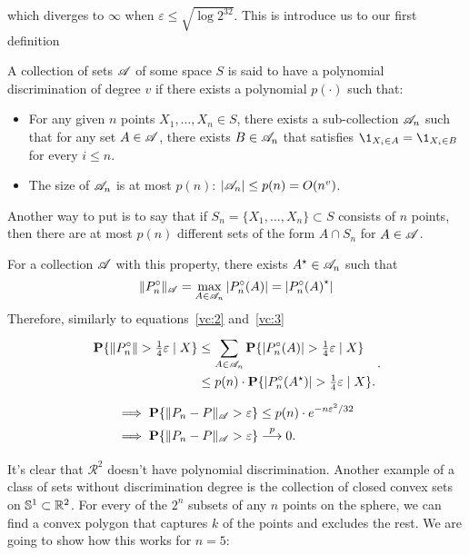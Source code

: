 which diverges to $\infty$ when $\varepsilon \leq \sqrt{\log 2^{32}}$. This is introduce us to our first definition

\begin{definition}
    A collection of sets $\AA$ of some space $S$ is said to have a polynomial discrimination of degree $v$ if there exists a polynomial $p(\cdot)$ such that:
    \begin{itemize}
        \item For any given $n$ points $X_1,\ldots, X_n \in S$, there exists a sub-collection $\AA_n$ such that for any set $A \in \AA$, there exists $B \in \AA_n$ that satisfies $\1_{X_i \in A} = \1_{X_i \in B}$ for every $i \leq n$.
        \item The size of $\AA_n$ is at most $p(n)$: $|\AA_n| \leq p(n) = O(n^v)$.
    \end{itemize}
    Another way to put is to say that if $S_n = \{X_1,\ldots, X_n\} \subset S$ consists of $n$ points, then there are at most $p(n)$ different sets of the form $A\cap S_n$ for $A\in\AA$.
\end{definition}

For a collection $\AA$ with this property, there exists $A^\star \in \AA_n$ such that
\[ \|P_n^\circ\|_\AA = \max_{A\in \AA_n} | P_n^\circ(A) | = | {P_n^\circ(A)}^\star |  \] 
Therefore, similarly to equations~\ref{vc:2} and~\ref{vc:3}
\begin{equation*}
    \everymath{\displaystyle}\arraycolsep=1.4pt\def\arraystretch{1.5}
    \begin{array}{rcl}
    \P\{ \|P_n^\circ\| > \tfrac{1}{4} \varepsilon \;|\; X \} & \leq & \sum_{A\in\AA_n}\P\{ |P_n^\circ(A)| > \tfrac{1}{4} \varepsilon \;|\; X \}\\
    & \leq & p(n) \cdot \P\{ |P_n^\circ(A^\star)| > \tfrac{1}{4} \varepsilon \;|\; X \} .
  \end{array}.
\end{equation*}
\[ \everymath{\displaystyle}\arraycolsep=1.4pt\def\arraystretch{1.5}
\begin{array}{rl}
    \implies & \P\{\|P_n-P\|_{\AA} > \varepsilon\} \leq p(n) \cdot e^{-n \varepsilon^2 / 32}\\
    \implies & \P\{\|P_n-P\|_\AA > \varepsilon\} \overset{p}{\longrightarrow} 0.
\end{array}\] 

\vspace*{1em}

It's clear that $\mathcal{R}^2$ doesn't have polynomial discrimination. Another example of a class of sets without discrimination degree is the collection of closed convex sets on $\S^1 \subset \R^2$. For every of the $2^n$ subsets of any $n$ points on the sphere, we can find a convex polygon that captures $k$ of the points and excludes the rest. We are going to show how this works for $n = 5$: 

